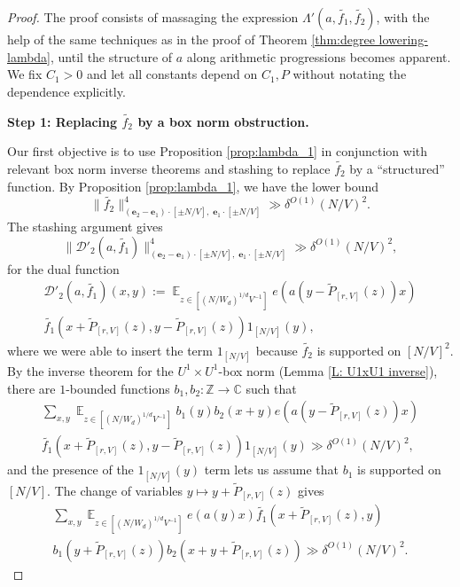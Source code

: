 \documentclass[11pt]{amsart}
\theoremstyle{definition}
\DeclareMathOperator*{\E}{\mathbb{E}}
\newcommand{\C}{{\mathbb C}}
\newcommand{\Z}{{\mathbb Z}}
\newcommand{\be}{{\mathbf{e}}}
\begin{document}
\begin{proof}

The proof consists of massaging the expression $\Lambda'(a,\widetilde{f_1}, \widetilde{f_2})$, with the help of the same techniques as in the proof of Theorem \ref{thm:degree lowering-lambda},
until the structure of $a$ along arithmetic progressions becomes apparent. We fix $C_1>0$ and let all constants depend on $C_1, P$ without notating the dependence explicitly.

\smallskip
\textbf{Step 1: Replacing $\widetilde{f_2}$ by a box norm obstruction.}
\smallskip

Our first objective is to use Proposition \ref{prop:lambda_1} in conjunction with relevant box norm inverse theorems and stashing to replace $\widetilde{f_2}$ by a ``structured'' function.
By Proposition \ref{prop:lambda_1}, we have the lower bound
$$\|\widetilde{f_2}\|_{(\be_2-\be_1)\cdot [\pm N/V],\; \be_1\cdot[\pm N/V]}^4 \gg \delta^{O(1)}(N/V)^2.$$
The stashing argument gives
$$\|\mathcal{D}'_2(a, \widetilde{f_1})\|_{(\be_2-\be_1)\cdot [\pm N/V],\; \be_1\cdot  [\pm N/V]}^4 \gg \delta^{O(1)}(N/V)^2,$$
for the dual function
\begin{multline*}
\mathcal{D}'_{2}(a, \widetilde{f_1})(x,y):=\E_{z \in [(N/W_d)^{1/d}V^{-1}]}e(a(y-\widetilde{P}_{[r, V]}(z))x)\\
\widetilde{f_1}(x+\widetilde{P}_{[r, V]}(z),y-\widetilde{P}_{[r, V]}(z))1_{[N/V]}(y),
\end{multline*}
where we were able to insert the term $1_{[N/V]}$ because $\widetilde{f_2}$ is supported on $[N/V]^2.$
By the inverse theorem for the $U^1\times U^1$-box norm (Lemma \ref{L: U1xU1 inverse}), there are $1$-bounded functions $b_1, b_2:\Z\to\C$ such that 
\begin{multline*}
\sum_{x, y} \E_{z \in [(N/W_d)^{1/d}V^{-1}]} b_1(y) b_2(x+y) e(a(y - \widetilde{P}_{[r,V]}(z))x)\\
\widetilde{f_1}(x + \widetilde{P}_{[r,V]}(z), y - \widetilde{P}_{[r,V]}(z))1_{[N/V]}(y) \gg \delta^{O(1)}(N/V)^2,    
\end{multline*}
and the presence of the $1_{[N/V]}(y)$ term lets us assume that $b_1$ is supported on $[N/V]$.
The change of variables 
$y \mapsto y + \widetilde{P}_{[r,V]}(z)$ gives
\begin{multline*}
\sum_{x, y}\E_{z \in [(N/W_d)^{1/d}V^{-1}]} e(a(y)x)
\widetilde{f_1}(x+ \widetilde{P}_{[r,V]}(z), y)\\
b_1(y+ \widetilde{P}_{[r,V]}(z)) b_2(x + y + \widetilde{P}_{[r,V]}(z)) \gg \delta^{O(1)}(N/V)^2.

\end{multline*}
\end{proof}
\end{document}

